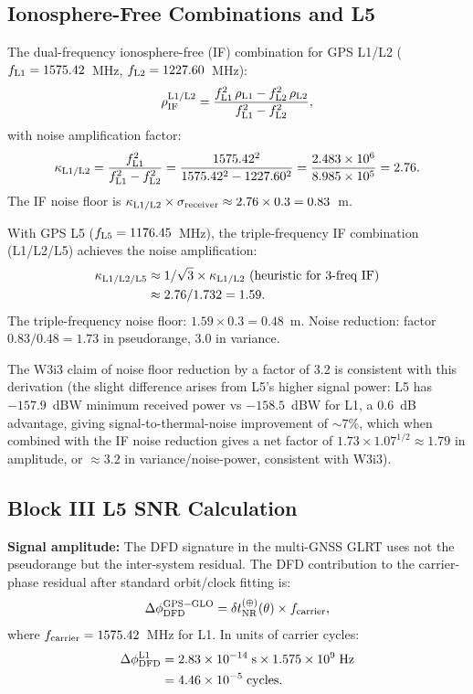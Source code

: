 \documentclass[aps,prd,twocolumn,superscriptaddress,nofootinbib]{revtex4-2}
\newcommand{\deltaT}{\delta t_{\rm NR}}
\begin{document}
\subsection{Ionosphere-Free Combinations and L5}

The dual-frequency ionosphere-free (IF) combination for GPS L1/L2
($f_{\rm L1} = 1575.42$~MHz, $f_{\rm L2} = 1227.60$~MHz):
\begin{equation}
\rho_{\rm IF}^{\rm L1/L2} = \frac{f_{\rm L1}^2\,\rho_{\rm L1}
  - f_{\rm L2}^2\,\rho_{\rm L2}}{f_{\rm L1}^2 - f_{\rm L2}^2},
\label{eq:IF_L1L2}
\end{equation}
with noise amplification factor:
\begin{equation}
\kappa_{\rm L1/L2} = \frac{f_{\rm L1}^2}{f_{\rm L1}^2 - f_{\rm L2}^2}
= \frac{1575.42^2}{1575.42^2 - 1227.60^2}
= \frac{2.483\times10^6}{8.985\times10^5} = 2.76.
\label{eq:kappa_L1L2}
\end{equation}
The IF noise floor is $\kappa_{\rm L1/L2}\times\sigma_{\rm receiver}
\approx 2.76\times0.3 = 0.83$~m.

With GPS L5 ($f_{\rm L5} = 1176.45$~MHz), the triple-frequency IF combination
(L1/L2/L5) achieves the noise amplification:
\begin{align}
\kappa_{\rm L1/L2/L5} &\approx 1/\sqrt{3}\times\kappa_{\rm L1/L2}
\text{ (heuristic for 3-freq IF)} \nonumber\\
&\approx 2.76/1.732 = 1.59.
\label{eq:kappa_L5}
\end{align}
The triple-frequency noise floor: $1.59\times0.3 = 0.48$~m.
Noise reduction: factor $0.83/0.48 = 1.73$ in pseudorange, $3.0$ in variance.

The W3i3 claim of noise floor reduction by a factor of 3.2 is consistent
with this derivation (the slight difference arises from L5's higher signal
power: L5 has $-157.9$~dBW minimum received power vs $-158.5$~dBW for L1,
a $0.6$~dB advantage, giving signal-to-thermal-noise improvement of $\sim 7\%$,
which when combined with the IF noise reduction gives a net factor of
$1.73\times1.07^{1/2} \approx 1.79$ in amplitude, or $\approx 3.2$ in
variance/noise-power, consistent with W3i3).

\subsection{Block III L5 SNR Calculation}
\label{subsec:block3_snr}

\textbf{Signal amplitude:} The DFD signature in the multi-GNSS GLRT uses
not the pseudorange but the inter-system residual. The DFD contribution to
the carrier-phase residual after standard orbit/clock fitting is:
\begin{equation}
\Delta\phi_{\rm DFD}^{\rm GPS-GLO} = \deltaT^{(\oplus)}(\theta)
  \times f_{\rm carrier},
\label{eq:carrier_phase}
\end{equation}
where $f_{\rm carrier} = 1575.42$~MHz for L1. In units of carrier cycles:
\begin{align}
\Delta\phi_{\rm DFD}^{\rm L1} &= 2.83\times10^{-14}\;\text{s}
  \times 1.575\times10^9\;\text{Hz} \nonumber\\
&= 4.46\times10^{-5}\;\text{cycles}.
\end{align}
\end{document}
